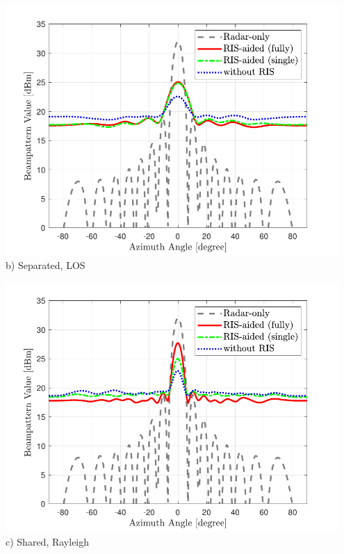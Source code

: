 \documentclass[paperwidth=841mm,paperheight=1300mm,portrait]{baposter}
\begin{document}
\begin{poster}
{\begin{minipage}[c]{0.37\textwidth}
\begin{minipage}[c]{\textwidth}
            \includegraphics[width=0.95\textwidth]{fig/beampattern_los_single_fully_b}\vspace{2pt}\\
            \small{b) Separated, LOS}
        \end{minipage}  
    \end{minipage}
    \begin{minipage}[c]{0.37\textwidth}
        \vspace{10pt}
        \begin{minipage}[c]{\textwidth}
            \centering
            \includegraphics[width=0.95\textwidth]{fig/beampattern_rayleigh_single_fully_d}\vspace{2pt}\\
            \small{c) Shared, Rayleigh}
        \end{minipage}\vspace{10pt}\\

\end{minipage}}
\end{poster}
\end{document}
